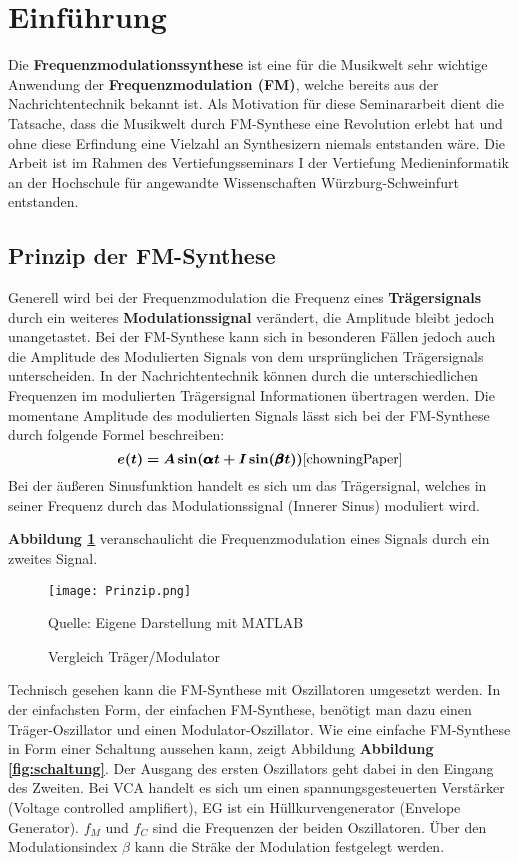\newpage
\section{Einführung}
Die \textbf{Frequenzmodulationssynthese} ist eine für die Musikwelt sehr wichtige Anwendung der \textbf{Frequenzmodulation (FM)}, welche bereits aus der Nachrichtentechnik bekannt ist. Als Motivation für diese Seminararbeit dient die Tatsache, dass die Musikwelt durch FM-Synthese eine Revolution erlebt hat und ohne diese Erfindung eine Vielzahl an Synthesizern niemals entstanden wäre. Die Arbeit ist im Rahmen des Vertiefungsseminars I der Vertiefung Medieninformatik an der Hochschule für angewandte Wissenschaften Würzburg-Schweinfurt entstanden. %
\FloatBarrier
\subsection{Prinzip der FM-Synthese}
\label{PrinzipFM}
Generell wird bei der Frequenzmodulation die Frequenz eines \textbf{Trägersignals} durch ein weiteres \textbf{Modulationssignal} verändert, die Amplitude bleibt jedoch unangetastet. Bei der FM-Synthese kann sich in besonderen Fällen jedoch auch die Amplitude des Modulierten Signals von dem ursprünglichen Trägersignals unterscheiden. In der Nachrichtentechnik können durch die unterschiedlichen Frequenzen im modulierten Trägersignal Informationen übertragen werden. 
Die momentane Amplitude des modulierten Signals lässt sich bei der FM-Synthese durch folgende Formel beschreiben:
\[
\bm{e(t) = A\sin(\pmb{\alpha} t + I\sin(\pmb{\beta} t))} \cite{chowningPaper}
\]
Bei der äußeren Sinusfunktion handelt es sich um das Trägersignal, welches in seiner Frequenz durch das Modulationssignal (Innerer Sinus) moduliert wird.

\textbf{Abbildung \ref{fig:vergleichSignale}} veranschaulicht die Frequenzmodulation eines Signals durch ein zweites Signal.

\begin{figure} [ht]
\centering
  \texttt{[image: Prinzip.png]}
\caption{Vergleich Träger/Modulator}
\label{fig:vergleichSignale}
Quelle: Eigene Darstellung mit MATLAB
\end{figure}
\FloatBarrier

Technisch gesehen kann die FM-Synthese mit Oszillatoren umgesetzt werden. In der einfachsten Form, der einfachen FM-Synthese, benötigt man dazu einen Träger-Oszillator und einen Modulator-Oszillator. Wie eine einfache FM-Synthese in Form einer Schaltung aussehen kann, zeigt Abbildung \textbf{Abbildung \ref{fig:schaltung}}. Der Ausgang des ersten Oszillators geht dabei in den Eingang des Zweiten. Bei VCA handelt es sich um einen spannungsgesteuerten Verstärker (Voltage controlled amplifiert), EG ist ein Hüllkurvengenerator (Envelope Generator). $f_M$ und $f_C$ sind die Frequenzen der beiden Oszillatoren. Über den Modulationsindex $\beta$ kann die Sträke der Modulation festgelegt werden. 

